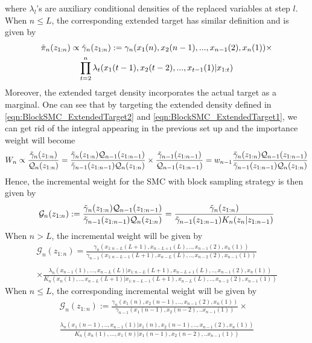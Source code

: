 \documentclass[12pt,a4paper]{article}
\begin{document}
where \(\lambda_l\)'s are auxiliary conditional densities of the replaced variables at step \(l\). When \(n \leq L\), the corresponding extended target has similar definition and is given by 
\begin{multline}
    \label{eqn:BlockSMC_ExtendedTarget1}
    \Tilde{\pi}_n(z_{1:n}) \propto \Tilde{\gamma}_n(z_{1:n}) := \gamma_n(x_1(n),x_2(n-1),...,x_{n-1}(2),x_{n}(1))\times\\
    \prod_{t=2}^n \lambda_t(x_{1}(t-1),x_{2}(t-2),...,x_{t-1}(1)|x_{1:t})
\end{multline}
Moreover, the extended target density incorporates the actual target as a marginal. One can see that by targeting the extended density defined in \eqref{eqn:BlockSMC_ExtendedTarget2} and \eqref{eqn:BlockSMC_ExtendedTarget1}, we can get rid of the integral appearing in the previous set up and the importance weight will become 
\begin{equation*}
W_n \propto \frac{\Tilde{\gamma}_n(z_{1:n})}{\mathcal{Q}_n(z_{1:n})} = \frac{\Tilde{\gamma}_n(z_{1:n})\mathcal{Q}_{n-1}(z_{1:n-1})}{\Tilde{\gamma}_{n-1}(z_{1:n-1})\mathcal{Q}_n(z_{1:n})}\times \frac{\Tilde{\gamma}_{n-1}(z_{1:n-1})}{\mathcal{Q}_{n-1}(z_{1:n-1})}=w_{n-1}\frac{\Tilde{\gamma}_n(z_{1:n})\mathcal{Q}_{n-1}(z_{1:n-1})}{\Tilde{\gamma}_{n-1}(z_{1:n-1})\mathcal{Q}_n(z_{1:n})}
\end{equation*}
Hence, the incremental weight for the SMC with block sampling strategy is then given by 
\begin{equation}
    \label{eqn:BlockSMC_Incrementalweight}
    \mathcal{G}_n(z_{1:n}) := \frac{\Tilde{\gamma}_n(z_{1:n})\mathcal{Q}_{n-1}(z_{1:n-1})}{\Tilde{\gamma}_{n-1}(z_{1:n-1})\mathcal{Q}_n(z_{1:n})} = \frac{\Tilde{\gamma}_n(z_{1:n})}{\Tilde{\gamma}_{n-1}(z_{1:n-1})K_n(z_n|z_{1:n-1})}
\end{equation}
When \(n > L\), the incremental weight will be given by 
\begin{multline}
    \label{eqn:BlockSMC_G2}
    \mathcal{G}_n(z_{1:n}) = \frac{\gamma_n(x_{1:n-L}(L+1),x_{n-L+1}(L),..,x_{n-1}(2),x_n(1))}{\gamma_{n-1}(x_{1:n-L-1}(L+1),x_{n-L}(L),..,x_{n-2}(2),x_{n-1}(1))} \\\\
    \times \frac{\lambda_n(x_{n-1}(1),...,x_{n-L}(L)|x_{1:n-L}(L+1),x_{n-L+1}(L),..,x_{n-1}(2),x_n(1))}{K_n(x_{n}(1),..,x_{n-L}(L+1)|x_{1:n-L-1}(L+1),x_{n-L}(L),..,x_{n-2}(2),x_{n-1}(1))}
\end{multline}
When \(n \leq L\), the corresponding incremental weight will be given by 
\begin{multline}
    \label{eqn:BlockSMC_G1}
    \mathcal{G}_n(z_{1:n}) := \frac{\gamma_n(x_1(n),x_2(n-1),..,x_{n-1}(2),x_n(1))}{\gamma_{n-1}(x_1(n-1),x_2(n-2),..x_{n-1}(1))}\times \\\\
    \frac{\lambda_n(x_1(n-1),..,x_{n-1}(1)|x_1(n),x_2(n-1),..,x_{n-1}(2),x_n(1))}{K_n(x_n(1),...,x_{1}(n)|x_1(n-1),x_2(n-2),..x_{n-1}(1))}
\end{multline}
\end{document}
